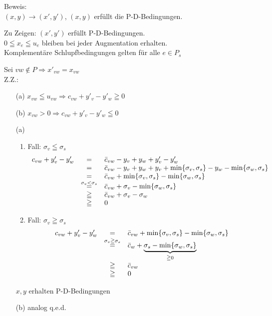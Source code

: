 Beweis:\\
$(x,y) \rightarrow (x',y')$, $(x,y)$ erfüllt die P-D-Bedingungen.

Zu Zeigen: $(x',y')$ erfüllt P-D-Bedingungen.\\
$0\leqq x_{e} \leqq u_{e}$ bleiben bei jeder Augmentation erhalten.\\
Komplementäre Schlupfbedingungen gelten für alle $e\in P_{s}$

Sei $v w \not\in P \Rightarrow x'_{v w} = x_{v w}$\\
Z.Z.:
\begin{itemize}
\item[] (a) $x_{v w} \leqq u_{v w} \Rightarrow c_{v w} + y'_{v} - y'_{w}
\geqq 0$
\item[] (b) $x_{v w} > 0 \Rightarrow c_{v w} + y'_{v} - y'_{w} \leqq 0$ 
\end{itemize}

\begin{itemize}
\item[(a)]
\begin{enumerate}
\item Fall: $\sigma_{v} \leqq \sigma_{s}$\\
\[\begin{array}{rcl}
c_{v w} + y'_{v} - y'_{w} &=& \bar{c}_{v w} - y_{v} + y_{w } + y'_{v} - y'_{w}\\
&=& \bar{c}_{v w} - y_{v} + y_{w} + y_{v} + \min\{\sigma_{v}, \sigma_{s}\} -
y_{w} - \min\{\sigma_{w},\sigma_{s}\}\\
&=& \bar{c}_{v w} + \min\{\sigma_{v},\sigma_{s}\} -
\min\{\sigma_{w},\sigma_{s}\}\\
&\stackrel{\sigma_{v} < \sigma_{s}}{=}& \bar{c}_{v w} + \sigma_{v} -
\min\{\sigma_{w},\sigma_{s}\}\\
&\geqq& \bar{c}_{v w} + \sigma_{v} - \sigma_{w}\\
&\geqq& 0
\end{array}
\]
\item Fall: $\sigma_{v} \geqq \sigma_{s}$
\[\begin{array}{rcl}
c_{v w} + y'_{v} - y'_{w} &=& \bar{c}_{v w} + \min\{\sigma_{v},\sigma_{s}\} -
\min\{\sigma_{w},\sigma_{s}\}\\
&\stackrel{\sigma_{v} \geqq \sigma_{s}}{=}& \bar{c}_{w} + \underbrace{
\sigma_{s} - \min\{\sigma_{w},\sigma_{s}\}}_{\geqq 0}\\
&\geqq& \bar{c}_{v w}\\
&\geqq& 0
\end{array}\]
\end{enumerate}
$x,y$ erhalten P-D-Bedingungen
\item[(b)] analog q.e.d.
\end{itemize}

